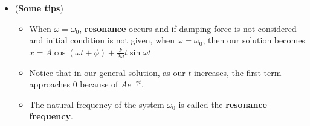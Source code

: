 \documentclass[10pt, landscape]{article}
\begin{document}
\begin{multicols}{4}
\begin{enumerate}
\begin{itemize}
        \item (\textbf{Some tips})
        \begin{itemize}
            \item When $\omega = \omega_0$, \textbf{resonance} occurs and if damping force is not considered and initial condition is not given, when $\omega = \omega_0$, then our solution becomes $x=A\cos(\omega t+\phi)+\frac{F}{2\omega}t\sin\omega t$
            \item Notice that in our general solution, as our $t$ increases, the first term approaches 0 because of $Ae^{-\gamma t}$.
            \item The natural frequency of the system $\omega_0$ is called the \textbf{resonance frequency}.
        \end{itemize}
    \end{itemize}
\end{enumerate}


\end{multicols}
\end{document}
